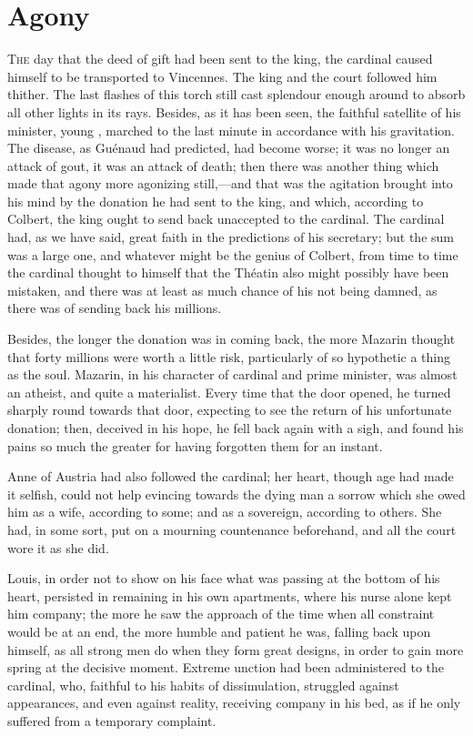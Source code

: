 \chapter{Agony}

\lettrine{T}{he} day that the deed of gift had been sent to the king, the cardinal caused himself to be transported to Vincennes. The king and the court followed him thither. The last flashes of this torch still cast splendour enough around to absorb all other lights in its rays. Besides, as it has been seen, the faithful satellite of his minister, young , marched to the last minute in accordance with his gravitation. The disease, as Guénaud had predicted, had become worse; it was no longer an attack of gout, it was an attack of death; then there was another thing which made that agony more agonizing still,—and that was the agitation brought into his mind by the donation he had sent to the king, and which, according to Colbert, the king ought to send back unaccepted to the cardinal. The cardinal had, as we have said, great faith in the predictions of his secretary; but the sum was a large one, and whatever might be the genius of Colbert, from time to time the cardinal thought to himself that the Théatin also might possibly have been mistaken, and there was at least as much chance of his not being damned, as there was of  sending back his millions.

Besides, the longer the donation was in coming back, the more Mazarin thought that forty millions were worth a little risk, particularly of so hypothetic a thing as the soul. Mazarin, in his character of cardinal and prime minister, was almost an atheist, and quite a materialist. Every time that the door opened, he turned sharply round towards that door, expecting to see the return of his unfortunate donation; then, deceived in his hope, he fell back again with a sigh, and found his pains so much the greater for having forgotten them for an instant.

Anne of Austria had also followed the cardinal; her heart, though age had made it selfish, could not help evincing towards the dying man a sorrow which she owed him as a wife, according to some; and as a sovereign, according to others. She had, in some sort, put on a mourning countenance beforehand, and all the court wore it as she did.

Louis, in order not to show on his face what was passing at the bottom of his heart, persisted in remaining in his own apartments, where his nurse alone kept him company; the more he saw the approach of the time when all constraint would be at an end, the more humble and patient he was, falling back upon himself, as all strong men do when they form great designs, in order to gain more spring at the decisive moment. Extreme unction had been administered to the cardinal, who, faithful to his habits of dissimulation, struggled against appearances, and even against reality, receiving company in his bed, as if he only suffered from a temporary complaint.

